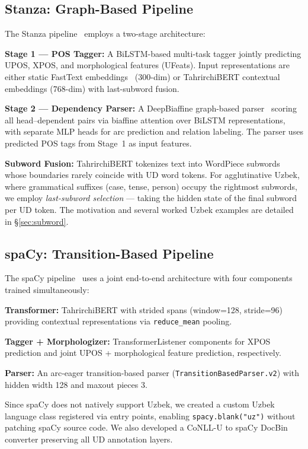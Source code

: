 \documentclass[10pt,conference,a4paper]{IEEEtran_EDM}
\begin{document}
\subsection{Stanza: Graph-Based Pipeline}

The Stanza pipeline~\cite{qi2020stanza} employs a two-stage architecture:

\textbf{Stage 1 --- POS Tagger:} A BiLSTM-based multi-task tagger jointly predicting UPOS, XPOS, and morphological features (UFeats). Input representations are either static FastText embeddings~\cite{bojanowski2017enriching} (300-dim) or TahrirchiBERT contextual embeddings (768-dim) with last-subword fusion.

\textbf{Stage 2 --- Dependency Parser:} A DeepBiaffine graph-based parser~\cite{dozat2017deep} scoring all head--dependent pairs via biaffine attention over BiLSTM representations, with separate MLP heads for arc prediction and relation labeling. The parser uses predicted POS tags from Stage~1 as input features.

\textbf{Subword Fusion:} TahrirchiBERT tokenizes text into WordPiece subwords whose boundaries rarely coincide with UD word tokens. For agglutinative Uzbek, where grammatical suffixes (case, tense, person) occupy the rightmost subwords, we employ \textit{last-subword selection} --- taking the hidden state of the final subword per UD token. The motivation and several worked Uzbek examples are detailed in \S\ref{sec:subword}.

\subsection{spaCy: Transition-Based Pipeline}

The spaCy pipeline~\cite{honnibal2020spacy} uses a joint end-to-end architecture with four components trained simultaneously:

\textbf{Transformer:} TahrirchiBERT with strided spans (window=128, stride=96) providing contextual representations via \texttt{reduce\_mean} pooling.

\textbf{Tagger + Morphologizer:} TransformerListener components for XPOS prediction and joint UPOS + morphological feature prediction, respectively.

\textbf{Parser:} An arc-eager transition-based parser (\texttt{TransitionBasedParser.v2}) with hidden width 128 and maxout pieces 3.

Since spaCy does not natively support Uzbek, we created a custom Uzbek language class registered via entry points, enabling \texttt{spacy.blank("uz")} without patching spaCy source code. We also developed a CoNLL-U to spaCy DocBin converter preserving all UD annotation layers.
\end{document}
